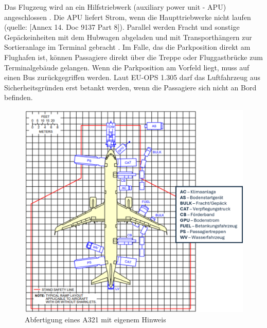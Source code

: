 Das Flugzeug wird an ein Hilfstriebwerk (auxiliary power unit - APU) angeschlossen \cite{mensen2013handbuch}. 
Die APU liefert Strom, wenn die Haupttriebwerke nicht laufen (quelle: [Annex 14. Doc 9137 Part 8]).
Parallel werden Fracht und sonstige Gepäckeinheiten mit dem Hubwagen abgeladen und mit Transporthängern zur Sortieranlage 
im Terminal gebracht \cite{mensen2013handbuch}. Im Falle, das die Parkposition direkt am Flughafen ist, 
können Passagiere direkt über die Treppe oder Fluggastbrücke zum Terminalgebäude gelangen. 
Wenn die Parkposition am Vorfeld liegt, muss auf einen Bus zurückgegriffen werden. 
Laut EU-OPS 1.305 darf das Luftfahrzeug aus Sicherheitsgründen erst betankt werden, wenn die Passagiere sich nicht an Bord befinden. 

\begin{figure}[h]
	\centering
	\includegraphics[width=0.8\linewidth]{Bilder/A321_Abfertigung.png}
	\caption[Abfertigung]{Abfertigung eines A321 \cite{airbus2022a321} mit eigenem Hinweis}
	\label{abfertigung}
\end{figure}



